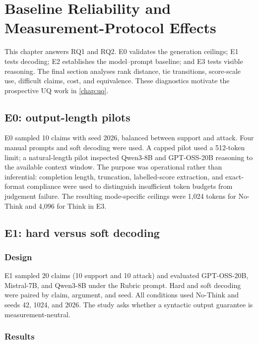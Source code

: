 \documentclass[11pt,twoside,a4paper]{report}
\begin{document}
\chapter{Baseline Reliability and Measurement-Protocol Effects}
\label{chap:baseline}

This chapter answers RQ1 and RQ2.  E0 validates the generation ceilings; E1 tests
decoding; E2 establishes the model--prompt baseline; and E3 tests visible reasoning.
The final section analyses rank distance, tie transitions, score-scale use, difficult
claims, cost, and equivalence.  These diagnostics motivate the prospective UQ work
in \cref{chap:uq}.

\section{E0: output-length pilots}

E0 sampled 10 claims with seed 2026, balanced between support and attack.  Four
manual prompts and soft decoding were used.  A capped pilot used a 512-token limit;
a natural-length pilot inspected Qwen3-8B and GPT-OSS-20B reasoning to the available
context window.  The purpose was operational rather than inferential: completion
length, truncation, labelled-score extraction, and exact-format compliance were used
to distinguish insufficient token budgets from judgement failure.  The resulting
mode-specific ceilings were 1,024 tokens for No-Think and 4,096 for Think in E3.

\section{E1: hard versus soft decoding}
\label{sec:e1}

\subsection{Design}

E1 sampled 20 claims (10 support and 10 attack) and evaluated GPT-OSS-20B,
Mistral-7B, and Qwen3-8B under the Rubric prompt.  Hard and soft decoding were paired
by claim, argument, and seed.  All conditions used No-Think and seeds 42, 1024, and
2026.  The study asks whether a syntactic output guarantee is measurement-neutral.

\subsection{Results}
\end{document}
